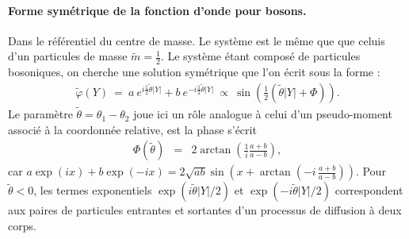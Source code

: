 \paragraph{Forme symétrique de la fonction d'onde pour bosons.}
Dans le référentiel du centre de masse. Le système est le même que que celuis d'un particules de masse $\tilde{m}= \frac{1}{2}$.
Le système étant composé de particules bosoniques, on cherche une solution symétrique que l’on écrit sous la forme  :
\begin{eqnarray}
	\tilde{\varphi}(Y) ~=~a~e^{i\frac{1}{2} \tilde{\theta} \vert Y \vert } + b~e^{-i\frac{1}{2} \tilde{\theta}\vert Y \vert } ~\propto~  \sin\left( \frac{1}{2} (\tilde{\theta} |Y| + \Phi ) \right). \label{eq:ansatz.boson}
\end{eqnarray}
Le paramètre \( \tilde{\theta} = \theta_1 - \theta_2 \) joue ici un rôle analogue à celui d’un pseudo-moment associé à la coordonnée relative,
est  la phase s'écrit
\begin{eqnarray}
	\Phi(\tilde{\theta}) &=& 2 \arctan\left (\frac{1}{i} \frac{a+b}{a-b}\right),	\label{chap:1:dif.mod.2.part.1} 
\end{eqnarray}
car \( a\exp(ix)+b\exp(-ix) = 2\sqrt{ab}\sin\left(x+\arctan\left(-i\, \frac{a+b}{a-b}\right)\right) \). Pour $\tilde{\theta}<0$, les termes exponentiels \( \exp(i\tilde{\theta} \vert Y \vert/2 ) \) et \( \exp(-i\tilde{\theta} \vert Y \vert/2 ) \) correspondent aux paires de particules entrantes et sortantes d’un processus de diffusion à deux corps.


